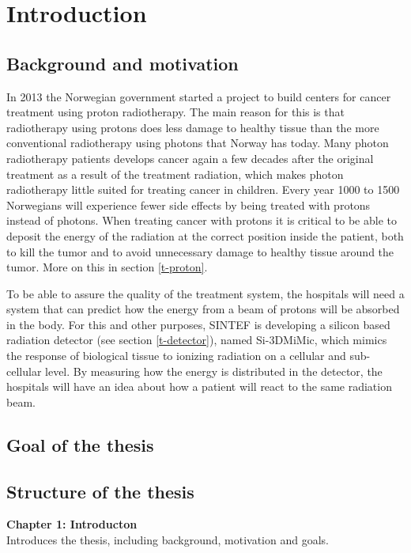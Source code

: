 \documentclass[../main/thesis.tex]{subfiles}
\begin{document}
\newpage

\chapter{Introduction}
\label{intro}
\section{Background and motivation}
\label{i-background}
In 2013 the Norwegian government started a project to build centers for cancer treatment using proton radiotherapy. The main reason for this is that radiotherapy using protons does less damage to healthy tissue than the more conventional radiotherapy using photons that Norway has today. Many photon radiotherapy patients develops cancer again a few decades after the original treatment as a result of the treatment radiation, which makes photon radiotherapy little suited for treating cancer in children. Every year 1000 to 1500 Norwegians will experience fewer side effects by being treated with protons instead of photons. \citep{uio2012} When treating cancer with protons it is critical to be able to deposit the energy of the radiation at the correct position inside the patient, both to kill the tumor and to avoid unnecessary damage to healthy tissue around the tumor. More on this in section \ref{t-proton}.

To be able to assure the quality of the treatment system, the hospitals will need a system that can predict how the energy from a beam of protons will be absorbed in the body. For this and other purposes, SINTEF is developing a silicon based radiation detector (see section \ref{t-detector}), named Si-3DMiMic, which mimics the response of biological tissue to ionizing radiation on a cellular and sub-cellular level. By measuring how the energy is distributed in the detector, the hospitals will have an idea about how a patient will react to the same radiation beam. \citep{sintef3dmimic}


\section{Goal of the thesis}
\label{i-goal}




\section{Structure of the thesis}
\label{i-structure}
\textbf{Chapter 1: Introducton}\\
Introduces the thesis, including background, motivation and goals.
\end{document}
